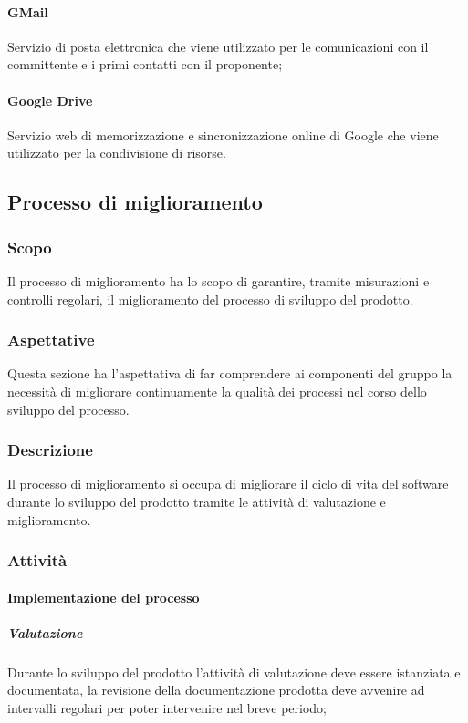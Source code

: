 \paragraph{GMail} 
Servizio di posta elettronica che viene utilizzato per le comunicazioni con il committente e i primi contatti con il proponente;
\paragraph{Google Drive} 
Servizio web di memorizzazione e sincronizzazione online di Google che viene utilizzato per la condivisione di risorse.


\newpage

\subsection{Processo di miglioramento}
\subsubsection{Scopo}
Il processo di miglioramento ha lo scopo di garantire, tramite misurazioni e controlli regolari, il miglioramento del processo di sviluppo del prodotto.

\subsubsection{Aspettative}
Questa sezione ha l'aspettativa di far comprendere ai componenti del gruppo la necessità di migliorare continuamente la qualità dei processi nel corso dello sviluppo del processo.


\subsubsection{Descrizione}
Il processo di miglioramento si occupa di migliorare il ciclo di vita del software durante lo sviluppo del prodotto tramite le attività di valutazione e miglioramento.


\subsubsection{Attività}
\paragraph{Implementazione del processo}

\subparagraph*{Valutazione} 
Durante lo sviluppo del prodotto l'attività di valutazione deve essere istanziata e documentata, la revisione della documentazione prodotta deve avvenire ad intervalli regolari per poter intervenire nel breve periodo;

